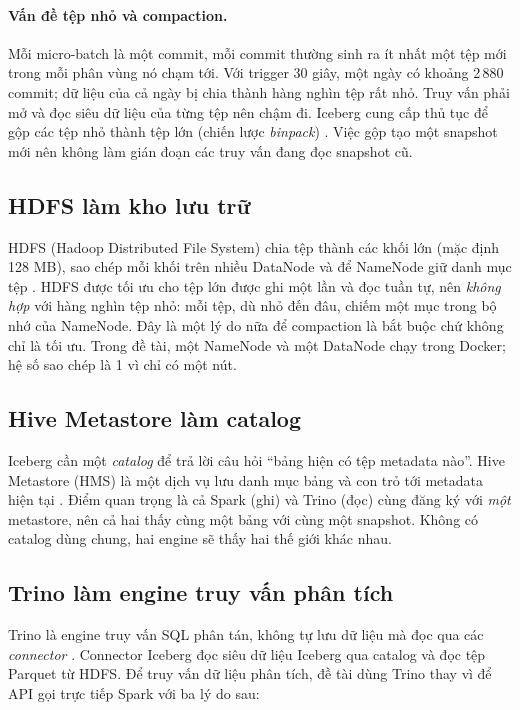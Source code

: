 \paragraph{Vấn đề tệp nhỏ và compaction.} Mỗi micro-batch là một commit, mỗi commit thường sinh ra ít nhất một tệp mới trong mỗi phân vùng nó chạm tới. Với trigger 30 giây, một ngày có khoảng 2\,880 commit; dữ liệu của cả ngày bị chia thành hàng nghìn tệp rất nhỏ. Truy vấn phải mở và đọc siêu dữ liệu của từng tệp nên chậm đi. Iceberg cung cấp thủ tục  để gộp các tệp nhỏ thành tệp lớn (chiến lược \emph{binpack}) \cite{iceberg_procedures}. Việc gộp tạo một snapshot mới nên không làm gián đoạn các truy vấn đang đọc snapshot cũ. 

\subsection{HDFS làm kho lưu trữ}
\label{sec:2-hdfs}

HDFS (Hadoop Distributed File System) chia tệp thành các khối lớn (mặc định 128 MB), sao chép mỗi khối trên nhiều DataNode và để NameNode giữ danh mục tệp \cite{hdfs_design}. HDFS được tối ưu cho tệp lớn được ghi một lần và đọc tuần tự, nên \emph{không hợp} với hàng nghìn tệp nhỏ: mỗi tệp, dù nhỏ đến đâu, chiếm một mục trong bộ nhớ của NameNode. Đây là một lý do nữa để compaction là bắt buộc chứ không chỉ là tối ưu. Trong đề tài, một NameNode và một DataNode chạy trong Docker; hệ số sao chép là 1 vì chỉ có một nút.

\subsection{Hive Metastore làm catalog}
\label{sec:2-hms}

Iceberg cần một \emph{catalog} để trả lời câu hỏi ``bảng  hiện có tệp metadata nào''. Hive Metastore (HMS) là một dịch vụ lưu danh mục bảng và con trỏ tới metadata hiện tại \cite{hive_metastore}. Điểm quan trọng là cả Spark (ghi) và Trino (đọc) cùng đăng ký với \emph{một} metastore, nên cả hai thấy cùng một bảng với cùng một snapshot. Không có catalog dùng chung, hai engine sẽ thấy hai thế giới khác nhau.

\subsection{Trino làm engine truy vấn phân tích}
\label{sec:2-trino}

Trino là engine truy vấn SQL phân tán, không tự lưu dữ liệu mà đọc qua các \emph{connector} \cite{trino_docs}. Connector Iceberg đọc siêu dữ liệu Iceberg qua catalog và đọc tệp Parquet từ HDFS. Để truy vấn dữ liệu phân tích, đề tài dùng Trino thay vì để API gọi trực tiếp Spark với ba lý do sau:


